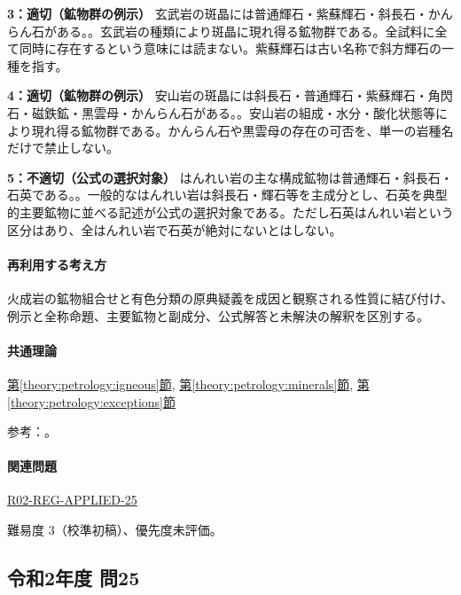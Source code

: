 \noindent\textbf{3：適切（鉱物群の例示）} 玄武岩の斑晶には普通輝石・紫蘇輝石・斜長石・かんらん石がある。。玄武岩の種類により斑晶に現れ得る鉱物群である。全試料に全て同時に存在するという意味には読まない。紫蘇輝石は古い名称で斜方輝石の一種を指す。\par

\noindent\textbf{4：適切（鉱物群の例示）} 安山岩の斑晶には斜長石・普通輝石・紫蘇輝石・角閃石・磁鉄鉱・黒雲母・かんらん石がある。。安山岩の組成・水分・酸化状態等により現れ得る鉱物群である。かんらん石や黒雲母の存在の可否を、単一の岩種名だけで禁止しない。\par

\noindent\textbf{5：不適切（公式の選択対象）} はんれい岩の主な構成鉱物は普通輝石・斜長石・石英である。。一般的なはんれい岩は斜長石・輝石等を主成分とし、石英を典型的主要鉱物に並べる記述が公式の選択対象である。ただし石英はんれい岩という区分はあり、全はんれい岩で石英が絶対にないとはしない。\par

\paragraph{再利用する考え方} 火成岩の鉱物組合せと有色分類の原典疑義を成因と観察される性質に結び付け、例示と全称命題、主要鉱物と副成分、公式解答と未解決の解釈を区別する。

\paragraph{共通理論} \hyperref[theory:petrology:igneous]{第\ref*{theory:petrology:igneous}節}, \hyperref[theory:petrology:minerals]{第\ref*{theory:petrology:minerals}節}, \hyperref[theory:petrology:exceptions]{第\ref*{theory:petrology:exceptions}節}

\par 参考：\cite{aist_crystal_colors,gsj_igneous2021,usgs_rock_thesaurus}。

\paragraph{関連問題} \hyperref[q:r02-reg-applied-25]{R02-REG-APPLIED-25}

\par 難易度 3（校準初稿）、優先度未評価。

\subsection{令和2年度 問25}
\label{q:r02-reg-applied-25}

